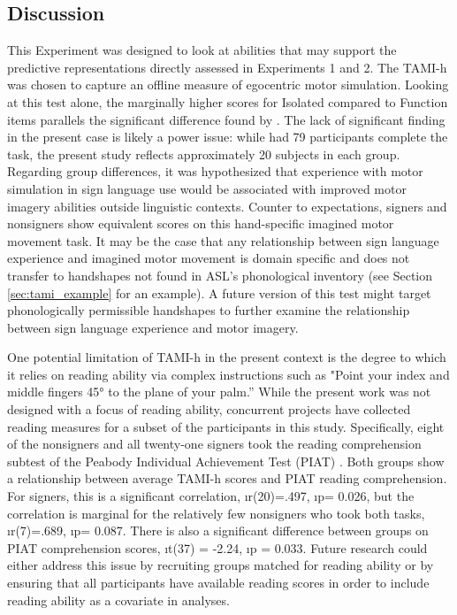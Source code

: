     \subsection{Discussion}
            This Experiment was designed to look at abilities that may support the predictive representations directly assessed in Experiments 1 and 2. The TAMI-h was chosen to capture an offline measure of egocentric motor simulation. Looking at this test alone, the marginally higher scores for Isolated compared to Function items parallels the significant difference found by . The lack of significant finding in the present case is likely a power issue: while  had 79 participants complete the task, the present study reflects approximately 20 subjects in each group. Regarding group differences, it was hypothesized that experience with motor simulation in sign language use would be associated with improved motor imagery abilities outside linguistic contexts. Counter to expectations, signers and nonsigners show equivalent scores on this hand-specific imagined motor movement task. It may be the case that any relationship between sign language experience and imagined motor movement is domain specific and does not transfer to handshapes not found in ASL’s phonological inventory (see Section \ref{sec:tami_example} for an example). A future version of this test might target phonologically permissible handshapes to further examine the relationship between sign language experience and motor imagery. \par
            One potential limitation of TAMI-h in the present context is the degree to which it relies on reading ability via complex instructions such as "Point your index and middle fingers 45° to the plane of your palm.” While the present work was not designed with a focus of reading ability, concurrent projects have collected reading measures for a subset of the participants in this study. Specifically, eight of the nonsigners and all twenty-one signers took the reading comprehension subtest of the Peabody Individual Achievement Test (PIAT) \cite{PIAT}. Both groups show a relationship between average TAMI-h scores and PIAT reading comprehension. For signers, this is a significant correlation, \i{r}(20)=.497, \i{p}= 0.026, but the correlation is marginal for the relatively few nonsigners who took both tasks, \i{r}(7)=.689, \i{p}= 0.087. There is also a significant difference between groups on PIAT comprehension scores, \i{t}(37) = -2.24, \i{p} = 0.033.  Future research could either address this issue by recruiting groups matched for reading ability or by ensuring that all participants have available reading scores in order to include reading ability as a covariate in analyses. \par
